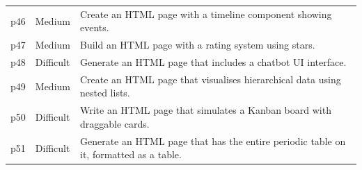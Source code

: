 \begin{longtable}{@{} l l p{13cm} @{}}
	p46         & Medium              & Create an HTML page with a timeline component showing events.                                      \\
	p47         & Medium              & Build an HTML page with a rating system using stars.                                               \\
	p48         & Difficult           & Generate an HTML page that includes a chatbot UI interface.                                        \\
	p49         & Medium              & Create an HTML page that visualises hierarchical data using nested lists.                          \\
	p50         & Difficult           & Write an HTML page that simulates a Kanban board with draggable cards.                             \\
	p51         & Difficult           & Generate an HTML page that has the entire periodic table on it, formatted as a table.              \\
\end{longtable}